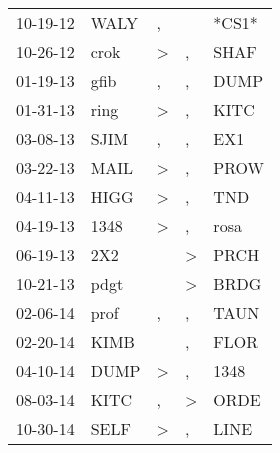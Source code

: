 \begin{supertabular}{p{0.07\textwidth}p{0.06\textwidth}p{0.02\textwidth}p{0.02\textwidth}p{0.06\textwidth}}
          10-19-12\textsuperscript{} &           WALY\textsuperscript{} &                , &               &                            *CS1* \\
          10-26-12\textsuperscript{} &           crok\textsuperscript{} &     \textgreater &             , &           SHAF\textsuperscript{} \\
          01-19-13\textsuperscript{} &           gfib\textsuperscript{} &                , &             , &           DUMP\textsuperscript{} \\
          01-31-13\textsuperscript{} &           ring\textsuperscript{} &     \textgreater &             , &           KITC\textsuperscript{} \\
          03-08-13\textsuperscript{} &           SJIM\textsuperscript{} &                , &             , &            EX1\textsuperscript{} \\
          03-22-13\textsuperscript{} &           MAIL\textsuperscript{} &     \textgreater &             , &           PROW\textsuperscript{} \\
          04-11-13\textsuperscript{} &           HIGG\textsuperscript{} &     \textgreater &             , &            TND\textsuperscript{} \\
          04-19-13\textsuperscript{} &           1348\textsuperscript{} &     \textgreater &             , &           rosa\textsuperscript{} \\
          06-19-13\textsuperscript{} &            2X2\textsuperscript{} &                  &  \textgreater &           PRCH\textsuperscript{} \\
          10-21-13\textsuperscript{} &           pdgt\textsuperscript{} &                  &  \textgreater &           BRDG\textsuperscript{} \\
          02-06-14\textsuperscript{} &           prof\textsuperscript{} &                , &             , &           TAUN\textsuperscript{} \\
          02-20-14\textsuperscript{} &           KIMB\textsuperscript{} &                  &             , &           FLOR\textsuperscript{} \\
          04-10-14\textsuperscript{} &           DUMP\textsuperscript{} &     \textgreater &             , &           1348\textsuperscript{} \\
          08-03-14\textsuperscript{} &           KITC\textsuperscript{} &                , &  \textgreater &           ORDE\textsuperscript{} \\
          10-30-14\textsuperscript{} &           SELF\textsuperscript{} &     \textgreater &             , &           LINE\textsuperscript{} \\

\end{supertabular}
